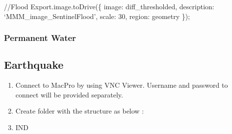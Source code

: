 \documentclass[]{book}
\theoremstyle{definition}
\theoremstyle{definition}
\theoremstyle{definition}
\theoremstyle{remark}
\begin{document}
//Flood Export.image.toDrive(\{ image: diff\_thresholded, description:
`MMM\_image\_SentinelFlood', scale: 30, region: geometry \});

\subsubsection{Permanent Water}\label{permanent-water}

\subsection{Earthquake}\label{earthquake}

\begin{enumerate}
\def\labelenumi{\arabic{enumi}.}
\item
  Connect to MacPro by using VNC Viewer. Username and password to
  connect will be provided separately.
\item
  Create folder with the structure as below :
\item
  IND


\end{enumerate}
\end{document}
